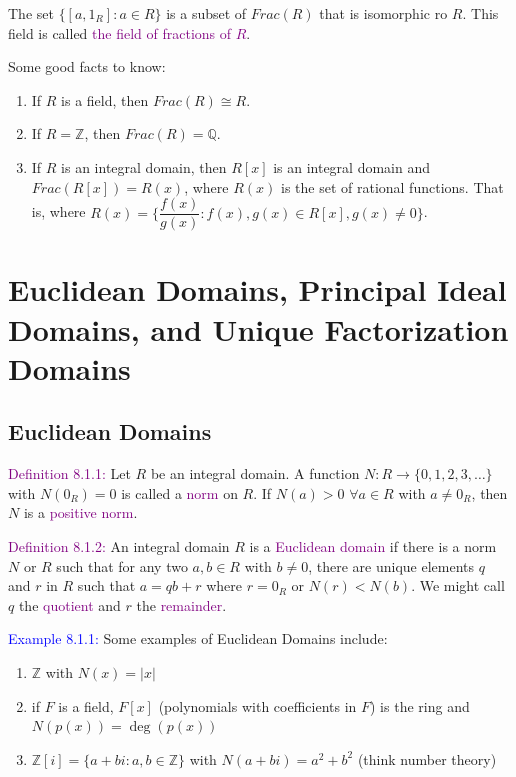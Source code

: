 \documentclass{article}
\begin{document}
The set $\{[a,1_R]: a \in R\}$ is a subset of $Frac(R)$ that is isomorphic ro $R$. This field is called \textcolor{purple}{the field of 
fractions of $R$}.

Some good facts to know:
\begin{enumerate}
    \item If $R$ is a field, then $Frac(R) \cong R$.
    \item If $R = \mathbb{Z}$, then $Frac(R) = \mathbb{Q}$.
    \item If $R$ is an integral domain, then $R[x]$ is an integral domain and $Frac(R[x]) = R(x)$, where $R(x)$ is the set of rational 
    functions. That is, where $R(x) = \biggl\{ \dfrac{f(x)}{g(x)}: f(x), g(x) \in R[x], g(x) \neq 0 \biggr\}$.
\end{enumerate}


\newpage

\section{Euclidean Domains, Principal Ideal Domains, and Unique Factorization Domains}
\subsection{Euclidean Domains}

\textcolor{purple}{Definition 8.1.1:} Let $R$ be an integral domain. A function $N: R \longrightarrow \{0,1,2,3, \dots\}$ with $N(0_R) = 0$ 
is called a \textcolor{purple}{norm} on $R$. If $N(a)>0$ $\forall a \in R$ with $a \neq 0_R$, then $N$ is a \textcolor{purple}{positive 
norm}.

\textcolor{purple}{Definition 8.1.2:} An integral domain $R$ is a \textcolor{purple}{Euclidean domain} if there is a norm $N$ or $R$ such 
that for any two $a,b \in R$ with $b \neq 0$, there are unique elements $q$ and $r$ in $R$ such that $a = qb+r$ where $r = 0_R$ or 
$N(r)<N(b)$. We might call $q$ the \textcolor{purple}{quotient} and $r$ the \textcolor{purple}{remainder}.

\textcolor{blue}{Example 8.1.1:} Some examples of Euclidean Domains include:
\begin{enumerate}
    \item $\mathbb{Z}$ with $N(x) = |x|$
    \item if $F$ is a field, $F[x]$ (polynomials with coefficients in $F$) is the ring and $N(p(x)) = \deg{(p(x))}$
    \item $\mathbb{Z}[i] = \{a+bi:a,b \in \mathbb{Z}\}$ with $N(a+bi) = a^2+b^2$ (think number theory)
\end{enumerate}
\end{document}
